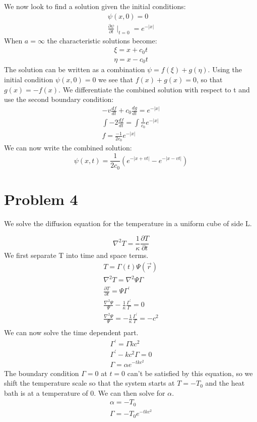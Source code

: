 \documentclass[a4paper,10pt]{article}
\numberwithin{equation}{section}
\begin{document}
We now look to find a solution given the initial conditions:
\begin{gather}
\psi(x,0)=0\\
\frac{\partial \psi}{\partial t}\mid_{t=0}=e^{-|x|}
\end{gather}
When $a=\infty$ the characteristic solutions become:
\begin{gather}
\xi=x+c_0t\\
\eta=x-c_0t
\end{gather}
The solution can be written as a combination $\psi=f(\xi)+g(\eta)$. 
Using the initial condition $\psi(x,0)=0$ we see that $f(x)+g(x)=0$, so that $g(x)=-f(x)$.
We differentiate the combined solution with respect to t and use the second boundary condition:
\begin{gather}
-v\frac{df}{dt}+c_0\frac{dg}{dt}=e^{-|x|}\\
\int-2\frac{df}{dt}=\int\frac{1}{c_0}e^{-|x|}\\
f=\frac{-1}{2c_0}e^{-|x|}
\end{gather}
We can now write the combined solution:
\begin{equation}
\psi(x,t)=\frac{1}{2c_0}(e^{-|x+vt|}-e^{-|x-vt|}) 
\end{equation}

\section{Problem 4}
We solve the diffusion equation for the temperature in a uniform cube of side L.

\begin{equation}
 \nabla^2T=\frac{1}{\kappa}\frac{\partial T}{\partial t}
\end{equation}
We first separate T into time and space terms.
\begin{gather}
 T=\Gamma (t)\Psi(\vec{r})\\
 \nabla ^2T=\nabla ^2 \Psi \Gamma\\
 \frac{\partial T}{\partial t}=\Psi \Gamma ^{\prime}\\
 \frac{\nabla ^2 \Psi}{\Psi}-\frac{1}{\kappa}\frac{\Gamma ^{\prime}}{\Gamma}=0\\
 \frac{\nabla ^2 \Psi}{\Psi}=-\frac{1}{\kappa}\frac{\Gamma ^{\prime}}{\Gamma}=-c^2\\
\end{gather}
We can now solve the time dependent part.
\begin{gather}
\Gamma ^{\prime}=\Gamma kc^2\\
\Gamma ^{\prime}-kc^2\Gamma=0\\
\Gamma=\alpha e^{-tkc^2}
\end{gather}
The boundary condition $\Gamma=0$ at $t=0$ can't be satisfied by this equation, so we shift the temperature scale so that the system
starts at $T=-T_0$ and the heat bath is at a temperature of 0. We can then solve for $\alpha$.
\begin{gather}
\alpha = -T_0\\
\Gamma=-T_0 e^{-tkc^2}
\end{gather}
\end{document}
